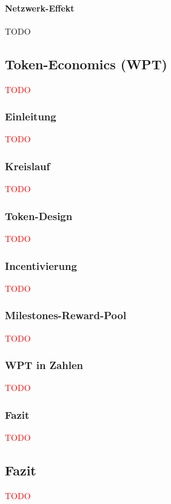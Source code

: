 \documentclass[11pt]{scrartcl}
\newcommand\todo[1]{\textcolor{red}{#1}}
\begin{document}
\paragraph{Netzwerk-Effekt}
\label{sec:zahlen_status_quo_netzwerk_effekt}

TODO


\subsection{Token-Economics (WPT)}
\label{sec:eco_wpt}
\todo{TODO}

\subsubsection{Einleitung}
\label{sec:wpt_einleitung}
\todo{TODO}

\subsubsection{Kreislauf}
\label{sec:wpt_kreislauf}
\todo{TODO}

\subsubsection{Token-Design}
\label{sec:wpt_design}
\todo{TODO}

\subsubsection{Incentivierung}
\label{sec:wpt_incent}
\todo{TODO}

\subsubsection{Milestones-Reward-Pool}
\label{sec:wpt_reward_pool}
\todo{TODO}

\subsubsection{WPT in Zahlen}
\label{sec:wpt_zahlen}
\todo{TODO}

\subsubsection{Fazit}
\label{sec:wpt_fazit}
\todo{TODO}


\subsection{Fazit}
\label{sec:eco_fazit}
\todo{TODO}
\end{document}
